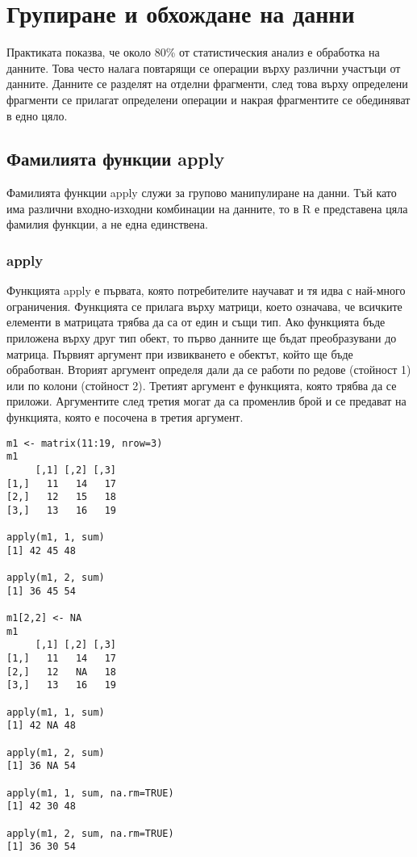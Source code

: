 \newpage
\chapter{Групиране и обхождане на данни}
\label{chapter06}
\thispagestyle{empty}

Практиката показва, че около 80\% от статистическия анализ е обработка на данните. Това често налага повтарящи се операции върху различни участъци от данните. Данните се разделят на отделни фрагменти, след това върху определени фрагменти се прилагат определени операции и накрая фрагментите се обединяват в едно цяло.

\section{Фамилията функции apply}

Фамилията функции apply служи за групово манипулиране на данни. Тъй като има различни входно-изходни комбинации на данните, то в R е представена цяла фамилия функции, а не една единствена.

\subsection{apply}

Функцията apply е първата, която потребителите научават и тя идва с най-много ограничения. Функцията се прилага върху матрици, което означава, че всичките елементи в матрицата трябва да са от един и същи тип. Ако функцията бъде приложена върху друг тип обект, то първо данните ще бъдат преобразувани до матрица. Първият аргумент при извикването е обектът, който ще бъде обработван. Вторият аргумент определя дали да се работи по редове (стойност 1) или по колони (стойност 2). Третият аргумент е функцията, която трябва да се приложи. Аргументите след третия могат да са променлив брой и се предават на функцията, която е посочена в третия аргумент.

\begin{lstlisting}[caption=Сума по редове и колони, label=listing0093]
m1 <- matrix(11:19, nrow=3)
m1
     [,1] [,2] [,3]
[1,]   11   14   17
[2,]   12   15   18
[3,]   13   16   19
 
apply(m1, 1, sum)
[1] 42 45 48
 
apply(m1, 2, sum)
[1] 36 45 54

m1[2,2] <- NA
m1
     [,1] [,2] [,3]
[1,]   11   14   17
[2,]   12   NA   18
[3,]   13   16   19

apply(m1, 1, sum)
[1] 42 NA 48

apply(m1, 2, sum)
[1] 36 NA 54

apply(m1, 1, sum, na.rm=TRUE)
[1] 42 30 48

apply(m1, 2, sum, na.rm=TRUE)
[1] 36 30 54
\end{lstlisting}


